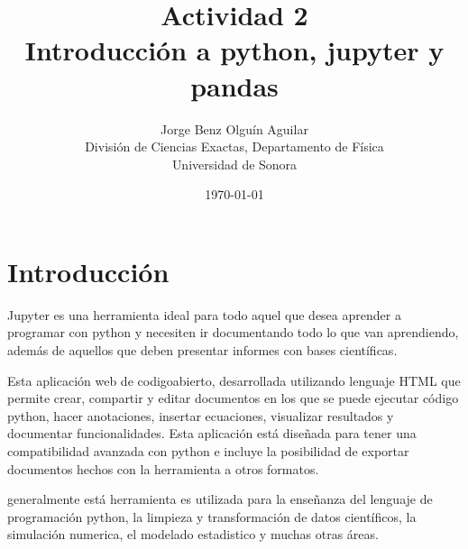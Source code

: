 \documentclass[12pt,a4paper]{article}
\begin{document}
\title{Actividad 2\\ Introducción a python, jupyter y pandas  }
\author{
 Jorge Benz Olguín Aguilar\\
\small{División de Ciencias Exactas, Departamento de Física}\\
\small{Universidad de Sonora}\\
}
\date{\small{\today}}
\maketitle

\section{Introducción}

Jupyter es una herramienta ideal para todo aquel que desea aprender a programar con python y necesiten ir documentando todo lo que van aprendiendo, además de aquellos que deben presentar informes con bases científicas.

Esta aplicación web de codigoabierto, desarrollada utilizando lenguaje HTML que permite crear, compartir y editar documentos en los que se puede ejecutar código python, hacer anotaciones, insertar ecuaciones, visualizar resultados y documentar funcionalidades. Esta aplicación está diseñada para tener una compatibilidad avanzada con python e incluye la posibilidad de exportar documentos hechos con la herramienta a otros formatos.

generalmente está herramienta es utilizada para la enseñanza del lenguaje de programación python, la limpieza y transformación de datos científicos, la simulación numerica, el modelado estadistico y muchas otras áreas.
\end{document}
